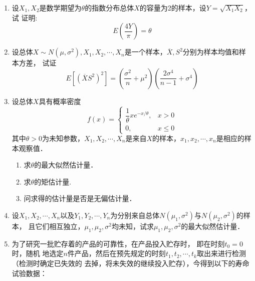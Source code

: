 \documentclass[10pt,a4paper]{article}
\begin{document}
    
\begin{enumerate}


    \item 设$X_1,X_2$是数学期望为$\theta$的指数分布总体$X$的容量为2的样本，设$Y=\sqrt{X_1X_2}$，试
    证明:
    $$E(\frac{4Y}{\pi})=\theta$$





    \item 设总体$X\sim N(\mu,\sigma^2),X_1,X_2,\cdots,X_n$是一个样本，$\overline{X},S^2$分别为样本均值和样本方差，
    试证
    $$E[(\overline{X}S^2)^2]=\left(\frac{\sigma^2}{n}+\mu^2\right)\left(\frac{2\sigma^4}{n-1}+\sigma^4\right)$$







    \item 设总体$X$具有概率密度
    $$f(x)=\left\{\begin{array}{ll}
        \dfrac{1}{\theta}xe^{-x/\theta}, & x>0\\
        0, & x\leq 0
    \end{array}\right.$$
    其中$\theta>0$为未知参数，$X_1,X_2,\cdots,X_n$是来自$X$的样本，$x_1,x_2,\cdots,x_n$是相应的样本观察值．
    \begin{enumerate}
        \item 求$\theta$的最大似然估计量．
        \item 求$\theta$的矩估计量.
        \item 问求得的估计量是否是无偏估计量．
    \end{enumerate}




    \item 设$X_1,X_2,\cdots,X_n$以及$Y_1,Y_2,\cdots,Y_n$为分别来自总体$N(\mu_1,\sigma^2)$与$N(\mu_2,\sigma^2)$的样本，
    且它们相互独立，$\mu_1,\mu_2,\sigma^2$均未知，试求$\mu_1,\mu_2,\sigma^2$的最大似然估计量．




    \item 为了研究一批贮存着的产品的可靠性，在产品投入贮存时， 即在时刻$t_0=0$时，随机
    地选定$n$件产品，然后在预先规定的时刻$t_1,t_2,\cdots,t_k$取出来进行检测（检测时确定已失效的
    去掉，将未失效的继续投入贮存），今得到以下的寿命试验数据：
    


    












  

\end{enumerate}
\end{document}
